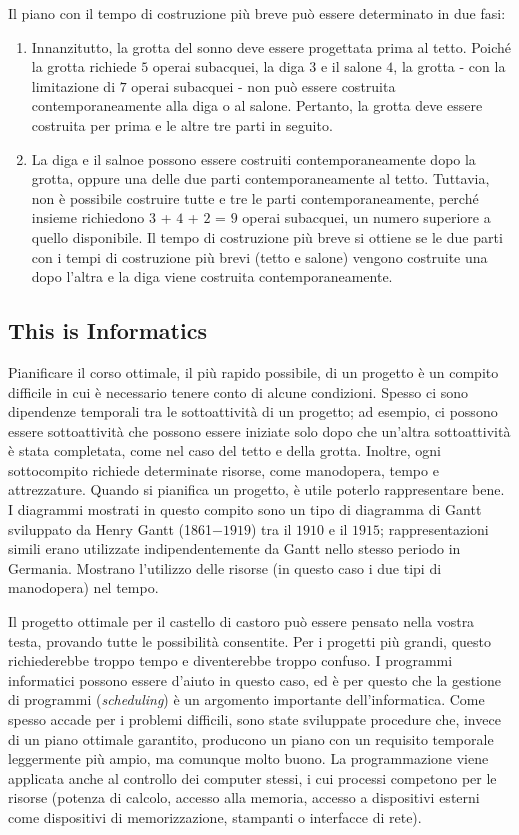 \documentclass[a4paper,11pt]{report}
\begin{document}
Il piano con il tempo di costruzione più breve può essere determinato in due fasi:

\begin{enumerate}
  \item Innanzitutto, la grotta del sonno deve essere progettata prima al tetto. Poiché la grotta richiede $5$ operai subacquei, la diga $3$ e il salone $4$, la grotta - con la limitazione di $7$ operai subacquei - non può essere costruita contemporaneamente alla diga o al salone. Pertanto, la grotta deve essere costruita per prima e le altre tre parti in seguito.
  \item La diga e il salnoe possono essere costruiti contemporaneamente dopo la grotta, oppure una delle due parti contemporaneamente al tetto. Tuttavia, non è possibile costruire tutte e tre le parti contemporaneamente, perché insieme richiedono $3$ + $4$ + $2$ = $9$ operai subacquei, un numero superiore a quello disponibile. Il tempo di costruzione più breve si ottiene se le due parti con i tempi di costruzione più brevi (tetto e salone) vengono costruite una dopo l’altra e la diga viene costruita contemporaneamente.
\end{enumerate}


\subsection*{This is Informatics}

Pianificare il corso ottimale, il più rapido possibile, di un progetto è un compito difficile in cui è necessario tenere conto di alcune condizioni. Spesso ci sono dipendenze temporali tra le sottoattività di un progetto; ad esempio, ci possono essere sottoattività che possono essere iniziate solo dopo che un’altra sottoattività è stata completata, come nel caso del tetto e della grotta. Inoltre, ogni sottocompito richiede determinate risorse, come manodopera, tempo e attrezzature. Quando si pianifica un progetto, è utile poterlo rappresentare bene. I diagrammi mostrati in questo compito sono un tipo di diagramma di Gantt sviluppato da Henry Gantt (1861$-1919$) tra il $1910$ e il $1915$; rappresentazioni simili erano utilizzate indipendentemente da Gantt nello stesso periodo in Germania. Mostrano l’utilizzo delle risorse (in questo caso i due tipi di manodopera) nel tempo.

Il progetto ottimale per il castello di castoro può essere pensato nella vostra testa, provando tutte le possibilità consentite. Per i progetti più grandi, questo richiederebbe troppo tempo e diventerebbe troppo confuso. I programmi informatici possono essere d’aiuto in questo caso, ed è per questo che la gestione di programmi (\emph{scheduling}) è un argomento importante dell’informatica. Come spesso accade per i problemi difficili, sono state sviluppate procedure che, invece di un piano ottimale garantito, producono un piano con un requisito temporale leggermente più ampio, ma comunque molto buono. La programmazione viene applicata anche al controllo dei computer stessi, i cui processi competono per le risorse (potenza di calcolo, accesso alla memoria, accesso a dispositivi esterni come dispositivi di memorizzazione, stampanti o interfacce di rete).
\end{document}
